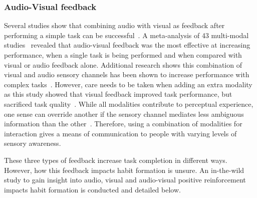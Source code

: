 \documentclass{scaffold/sigchi}
\begin{document}
\subsubsection{Audio-Visual feedback}
Several studies show that combining audio with visual as feedback after performing a simple task can be successful~\cite{benefits_of_audio_visual_1, benefits_of_audio_visual_2}. A meta-analysis of 43 multi-modal studies~\cite{comparing_modalities_effects_of_visual_auditory} revealed that audio-visual feedback was the most effective at increasing performance, when a single task is being performed and when compared with visual or audio feedback alone. Additional research shows this combination of visual and audio sensory channels has been shown to increase performance with complex tasks~\cite{chi_oussama_tap_the_shapetones}. However, care needs to be taken when adding an extra modality as this study showed that visual feedback improved task performance, but sacrificed task quality~\cite{comparing_modalities_effects_of_visual_auditory}. While all modalities contribute to perceptual experience, one sense can override another if the sensory channel mediates less ambiguous information than the other~\cite{one_mode_override_another}. Therefore, using a combination of modalities for interaction gives a means of communication to people with varying levels of sensory awareness.


These three types of feedback increase task completion in different ways. However, how this feedback impacts habit formation is unsure. An in-the-wild study to gain insight into audio, visual and audio-visual positive reinforcement impacts habit formation is conducted and detailed below.
\end{document}
